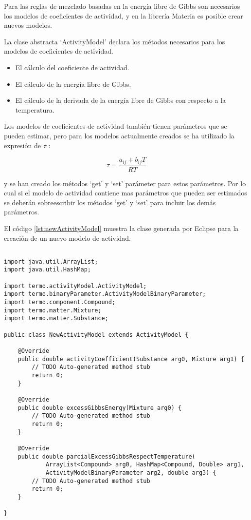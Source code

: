 	Para las reglas de mezclado basadas en la energía libre de Gibbs son necesarios los modelos de coeficientes de actividad, y en la librería Materia es posible crear nuevos modelos.

	La clase abstracta `ActivityModel' declara los métodos necesarios para los modelos de coeficientes de actividad.

	\begin{itemize}
		\item El cálculo del coeficiente de actividad.
		\item El cálculo de la energía libre de Gibbs.
		\item El cálculo de la derivada de la energía libre de Gibbs con respecto a la temperatura.
	\end{itemize}

	Los modelos de coeficientes de actividad también tienen parámetros que se pueden estimar, pero para los modelos actualmente creados se ha utilizado la expresión de $\tau$ :

	\begin{equation}
		\tau = \frac{a_{ij} + b_{ij} T}{R T}
	\end{equation}

	y se han creado los métodos `get' y `set' parámeter para estos parámetros. Por lo cual si el modelo de actividad contiene mas parámetros que pueden ser estimados se deberán sobreescribir los métodos `get' y `set' para incluir los demás parámetros.

	El código \ref{lst:newActivityModel} muestra la clase generada por Eclipse para la creación de un nuevo modelo de actividad.

	\begin{lstlisting}[caption={Esqueleto de clase para la creación de un nuevo modelo de actividad},label={lst:newActivityModel}]

import java.util.ArrayList;
import java.util.HashMap;

import termo.activityModel.ActivityModel;
import termo.binaryParameter.ActivityModelBinaryParameter;
import termo.component.Compound;
import termo.matter.Mixture;
import termo.matter.Substance;

public class NewActivityModel extends ActivityModel {

	@Override
	public double activityCoefficient(Substance arg0, Mixture arg1) {
		// TODO Auto-generated method stub
		return 0;
	}

	@Override
	public double excessGibbsEnergy(Mixture arg0) {
		// TODO Auto-generated method stub
		return 0;
	}

	@Override
	public double parcialExcessGibbsRespectTemperature(
			ArrayList<Compound> arg0, HashMap<Compound, Double> arg1,
			ActivityModelBinaryParameter arg2, double arg3) {
		// TODO Auto-generated method stub
		return 0;
	}

}
	\end{lstlisting}


